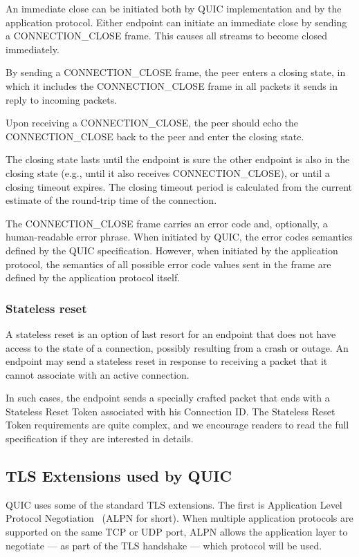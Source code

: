 An immediate close can be initiated both by QUIC implementation and by the application protocol.
Either endpoint can initiate an immediate close by sending a CONNECTION\_CLOSE frame. This causes
all streams to become closed immediately.

By sending a CONNECTION\_CLOSE frame, the peer enters a closing state, in which it includes the
CONNECTION\_CLOSE frame in all packets it sends in reply to incoming packets.

Upon receiving a CONNECTION\_CLOSE, the peer should echo the CONNECTION\_CLOSE back to the peer and
enter the closing state.

The closing state lasts until the endpoint is sure the other endpoint is also in the closing state
(e.g., until it also receives CONNECTION\_CLOSE), or until a closing timeout expires. The closing
timeout period is calculated from the current estimate of the round-trip time of the connection.

The CONNECTION\_CLOSE frame carries an error code and, optionally, a human-readable error phrase.
When initiated by QUIC, the error codes semantics defined by the QUIC specification. However, when
initiated by the application protocol, the semantics of all possible error code values sent in the
frame are defined by the application protocol itself.

\subsubsection{Stateless reset}

A stateless reset is an option of last resort for an endpoint that does not have access to the state
of a connection, possibly resulting from a crash or outage. An endpoint may send a stateless reset
in response to receiving a packet that it cannot associate with an active connection.

In such cases, the endpoint sends a specially crafted packet that ends with a Stateless Reset Token
associated with his Connection ID\@. The Stateless Reset Token requirements are quite complex, and
we encourage readers to read the full specification if they are interested in details. 

\subsection{TLS Extensions used by QUIC}

QUIC uses some of the standard TLS extensions. The first is Application Level Protocol
Negotiation~\cite{rfc7301} (ALPN for short). When multiple application protocols are supported on
the same TCP or UDP port, ALPN allows the application layer to negotiate --- as part of the TLS
handshake --- which protocol will be used.


